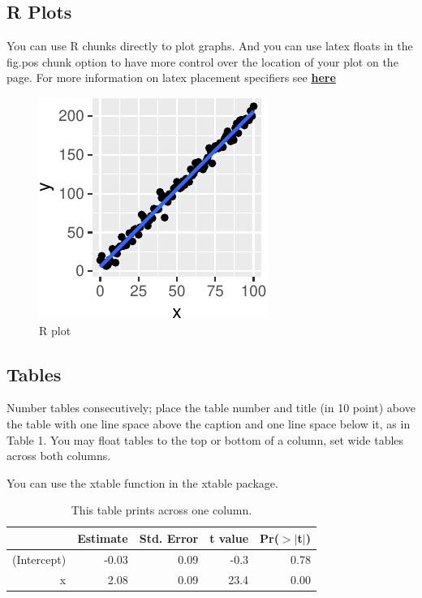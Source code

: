 \documentclass[10pt, letterpaper]{article}
\newenvironment{CodeChunk}{}{}
\begin{document}
\subsection{R Plots}\label{r-plots}

You can use R chunks directly to plot graphs. And you can use latex
floats in the fig.pos chunk option to have more control over the
location of your plot on the page. For more information on latex
placement specifiers see
\textbf{\href{https://en.wikibooks.org/wiki/LaTeX/Floats,_Figures_and_Captions}{here}}

\begin{CodeChunk}
\begin{figure}[H]

{\centering \includegraphics{figs/plot-1} 

}

\caption[R plot]{R plot}\label{fig:plot}
\end{figure}
\end{CodeChunk}

\subsection{Tables}\label{tables}

Number tables consecutively; place the table number and title (in 10
point) above the table with one line space above the caption and one
line space below it, as in Table 1. You may float tables to the top or
bottom of a column, set wide tables across both columns.

You can use the xtable function in the xtable package.

\begin{table}[H]
\centering
\begin{tabular}{rrrrr}
  \hline
 & Estimate & Std. Error & t value & Pr($>$$|$t$|$) \\ 
  \hline
(Intercept) & -0.03 & 0.09 & -0.3 & 0.78 \\ 
  x & 2.08 & 0.09 & 23.4 & 0.00 \\ 
   \hline
\end{tabular}
\caption{This table prints across one column.} 
\end{table}
\end{document}
